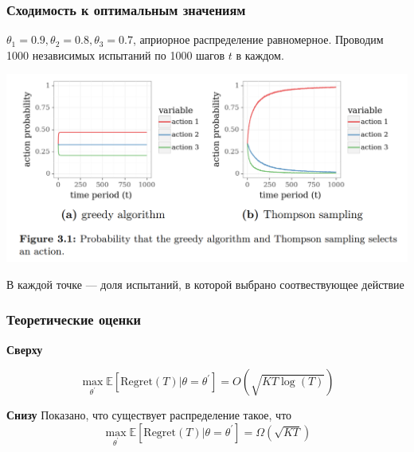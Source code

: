 \documentclass[fullscreen=true, bookmarks=true, hyperref={pdfencoding=unicode}]{beamer}
\begin{document}
\begin{frame}
  \frametitle{Сходимость к оптимальным значениям}

  $\theta_1 = 0.9, \theta_2 = 0.8, \theta_3 = 0.7$, априорное распределение равномерное. Проводим 1000 независимых испытаний по 1000 шагов $t$ в каждом.
  \begin{center}
    \includegraphics[keepaspectratio,
                     width=.9\paperwidth]{greedy_tompson.png}

     {\small В каждой точке — доля испытаний, в которой выбрано соотвествующее действие}
  \end{center}

\end{frame}


\begin{frame}
  \frametitle{Теоретические оценки}

  {\bf Сверху}

  $$ \max\limits_{\theta^\prime} \mathbb{E}[\text{Regret}(T) | \theta = \theta^\prime] = O\left(\sqrt{KT \log(T)} \right)$$

  {\bf Снизу}
  Показано, что существует распределение такое, что $$ \max\limits_{\theta^\prime} \mathbb{E}[\text{Regret}(T) | \theta = \theta^\prime] = \Omega\left(\sqrt{KT } \right)$$

\end{frame}
\end{document}

